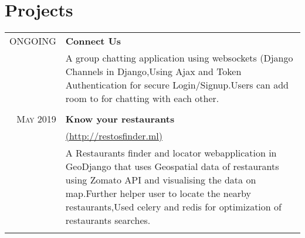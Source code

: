 \documentclass[a4paper,1pt]{article}
\begin{document}
\section{Projects}
\begin{tabular}{r|p{11cm}}
\textsc{ONGOING} & \textbf{Connect Us}\\&\footnotesize{A group chatting application using websockets (Django Channels in Django,Using Ajax and Token Authentication for secure Login/Signup.Users can add room to for chatting with each other.}\\\multicolumn{2}{c}{}\\
\textsc{May 2019} & \textbf{Know your restaurants}\\&\href{http://restosfinder.ml}{(http://restosfinder.ml)}\\&\footnotesize{A Restaurants finder and locator webapplication in GeoDjango that uses Geospatial data of restaurants using Zomato API and visualising the data on map.Further helper user to locate the nearby restaurants,Used celery and redis for optimization of restaurants searches.}\\\multicolumn{2}{c}{} \\


\end{tabular}
\end{document}
